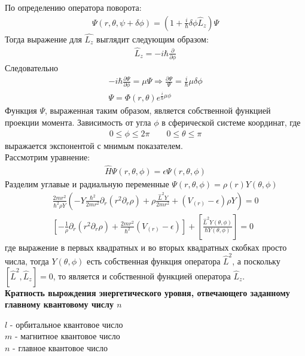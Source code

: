 \documentclass[__main__.tex]{subfiles}
\begin{document}
По определению оператора поворота:
\begin{gather}
\Psi(r,\theta,\psi+\delta \phi) = \left(1+\frac{i}{\hbar}\delta \phi \hat{L}_z\right)\Psi
\end{gather}
Тогда выражение для $\hat{L_z}$ выглядит следующим образом:
\begin{gather}
\hat{L}_z = -i\hbar\frac{\partial}{\partial \phi}
\end{gather}
Следовательно
\begin{gather}
-i\hbar \frac{\partial \Psi}{\partial \phi} = \mu \Psi \Longrightarrow \frac{\partial \Psi}{\Psi} = \frac{i}{\hbar}\mu \delta \phi\\
\Psi = \Phi(r,\theta)e^{\frac{i}{\hbar}\mu \phi}
\end{gather}
Функция $\Psi$, выраженная таким образом, является собственной функцией проекции момента. Зависимость от угла $\phi$ в сферической системе координат, где
\begin{gather}
0 \leq \phi \leq 2\pi \qquad 0\leq \theta \leq \pi
\end{gather}
выражается экспонентой с мнимым показателем.\\
Рассмотрим уравнение:
\begin{gather}
\hat{H}\Psi(r,\theta,\phi) = \epsilon \Psi(r,\theta,\phi)
\end{gather}
Разделим углавые и радиальную переменные $\Psi(r,\theta,\phi) = \rho(r)Y(\theta,\phi)$
\begin{gather}
\frac{2mr^2}{\hbar^2\rho Y} \left(-Y\frac{\hbar^2}{2mr^2}\partial_r(r^2\partial_r \rho) + \rho \frac{\hat{L}^2Y}{2mr^2} + (V_{(r)}-\epsilon)\rho Y\right) = 0\\
[-\frac{1}{\rho} \partial_r(r^2\partial_r \rho) + \frac{2mr^2}{\hbar^2}(V_{(r)}-\epsilon) ]+[ \frac{\hat{L}^2 Y(\theta,\phi)}{\hbar Y(\theta,\phi)}] = 0
\end{gather}
где выражение в первых квадратных и во вторых квадратных скобках просто числа, тогда $Y(\theta,\phi)$ есть собственная функция оператора $\hat{L}^2$, а поскольку $[\hat{L}^2,\hat{L}_z] = 0$, то является и собственной функцией оператора $\hat{L}_z$.\\
\textbf{Кратность вырождения энергетического уровня, отвечающего заданному главному квантовому числу $n$}\\
\begin{definition}
$l$ - орбитальное квантовое число\\
$m$ - магнитное квантовое число\\
$n$ - главное квантовое число\\
\end{definition}
\end{document}
